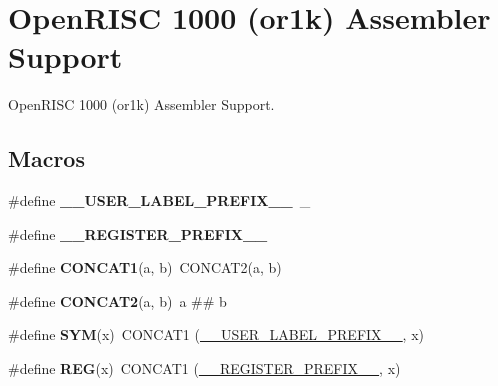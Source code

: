 \hypertarget{group__RTEMSScoreCPUor1kASM}{}\section{Open\+R\+I\+SC 1000 (or1k) Assembler Support}
\label{group__RTEMSScoreCPUor1kASM}


Open\+R\+I\+SC 1000 (or1k) Assembler Support.  


\subsection*{Macros}
\begin{DoxyCompactItemize}
\item 
\mbox{\label{group__RTEMSScoreCPUor1kASM_gaff6bf0ff0fa3b5cbd23a8ae1131c87a9}} 
\#define {\bfseries \+\_\+\+\_\+\+U\+S\+E\+R\+\_\+\+L\+A\+B\+E\+L\+\_\+\+P\+R\+E\+F\+I\+X\+\_\+\+\_\+}~\+\_\+
\item 
\mbox{\label{group__RTEMSScoreCPUor1kASM_ga08d4062230ffc8494f4be4f6447497e4}} 
\#define {\bfseries \+\_\+\+\_\+\+R\+E\+G\+I\+S\+T\+E\+R\+\_\+\+P\+R\+E\+F\+I\+X\+\_\+\+\_\+}
\item 
\mbox{\label{group__RTEMSScoreCPUor1kASM_gac1bd762df6f68795cfe6a980728bf233}} 
\#define {\bfseries C\+O\+N\+C\+A\+T1}(a,  b)~C\+O\+N\+C\+A\+T2(a, b)
\item 
\mbox{\label{group__RTEMSScoreCPUor1kASM_ga2fef427b1927dac8bf612d1384f00503}} 
\#define {\bfseries C\+O\+N\+C\+A\+T2}(a,  b)~a \#\# b
\item 
\mbox{\label{group__RTEMSScoreCPUor1kASM_gafe05d428a5f345f51fb591debb815325}} 
\#define {\bfseries S\+YM}(x)~C\+O\+N\+C\+A\+T1 (\mbox{\hyperlink{group__RTEMSScoreCPUx86-64ASM_gaff6bf0ff0fa3b5cbd23a8ae1131c87a9}{\+\_\+\+\_\+\+U\+S\+E\+R\+\_\+\+L\+A\+B\+E\+L\+\_\+\+P\+R\+E\+F\+I\+X\+\_\+\+\_\+}}, x)
\item 
\mbox{\label{group__RTEMSScoreCPUor1kASM_gacee196421e9a06f7700bb3064b13b37a}} 
\#define {\bfseries R\+EG}(x)~C\+O\+N\+C\+A\+T1 (\mbox{\hyperlink{group__RTEMSScoreCPUV850ASM_ga08d4062230ffc8494f4be4f6447497e4}{\+\_\+\+\_\+\+R\+E\+G\+I\+S\+T\+E\+R\+\_\+\+P\+R\+E\+F\+I\+X\+\_\+\+\_\+}}, x)

\end{DoxyCompactItemize}
